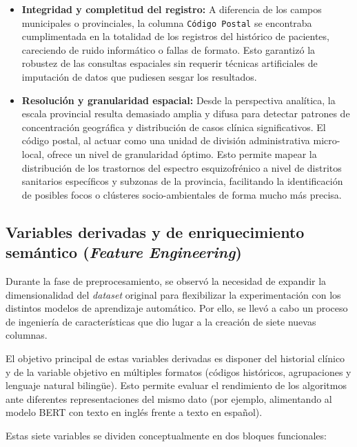 \documentclass[12pt,a4paper,onecolumn,oneside]{report}
\begin{document}
\begin{itemize}
    \item \textbf{Integridad y completitud del registro:} A diferencia de los campos municipales o provinciales, la columna \texttt{Código Postal} se encontraba cumplimentada en la totalidad de los registros del histórico de pacientes, careciendo de ruido informático o fallas de formato. Esto garantizó la robustez de las consultas espaciales sin requerir técnicas artificiales de imputación de datos que pudiesen sesgar los resultados.
    
    \item \textbf{Resolución y granularidad espacial:} Desde la perspectiva analítica, la escala provincial resulta demasiado amplia y difusa para detectar patrones de concentración geográfica y distribución de casos clínica significativos. El código postal, al actuar como una unidad de división administrativa micro-local, ofrece un nivel de granularidad óptimo. Esto permite mapear la distribución de los trastornos del espectro esquizofrénico a nivel de distritos sanitarios específicos y subzonas de la provincia, facilitando la identificación de posibles focos o clústeres socio-ambientales de forma mucho más precisa.
\end{itemize}

\subsection{Variables derivadas y de enriquecimiento semántico (\textit{Feature Engineering})}

Durante la fase de preprocesamiento, se observó la necesidad de expandir la dimensionalidad del \textit{dataset} original para flexibilizar la experimentación con los distintos modelos de aprendizaje automático. Por ello, se llevó a cabo un proceso de ingeniería de características que dio lugar a la creación de siete nuevas columnas. 

El objetivo principal de estas variables derivadas es disponer del historial clínico y de la variable objetivo en múltiples formatos (códigos históricos, agrupaciones y lenguaje natural bilingüe). Esto permite evaluar el rendimiento de los algoritmos ante diferentes representaciones del mismo dato (por ejemplo, alimentando al modelo BERT con texto en inglés frente a texto en español).

Estas siete variables se dividen conceptualmente en dos bloques funcionales:
\end{document}
